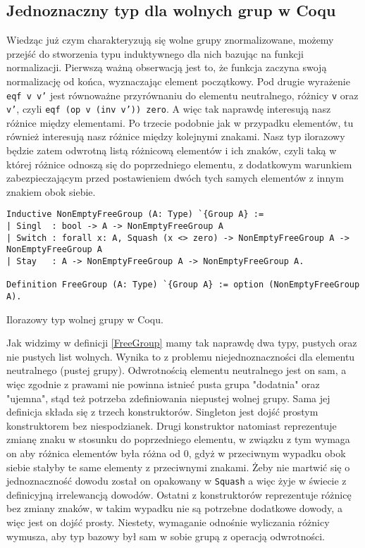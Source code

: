\subsection{Jednoznaczny typ dla wolnych grup w Coqu}
Wiedząc już czym charakteryzują się wolne grupy znormalizowane, możemy przejść do stworzenia typu induktywnego dla nich bazując na funkcji normalizacji. Pierwszą ważną obserwacją jest to, że funkcja zaczyna swoją normalizację od końca, wyznaczając element początkowy. Pod drugie wyrażenie \texttt{eqf v v'} jest równoważne przyrównaniu do elementu neutralnego, różnicy  \texttt{v} oraz \texttt{v'}, czyli \texttt{eqf (op v (inv v')) zero}. A więc tak naprawdę interesują nasz różnice między elementami. Po trzecie podobnie jak w przypadku elementów, tu również interesują nasz różnice między kolejnymi znakami. Nasz typ ilorazowy będzie zatem odwrotną listą różnicową elementów i ich znaków, czyli taką w której różnice odnoszą się do poprzedniego elementu, z dodatkowym warunkiem zabezpieczającym przed postawieniem dwóch tych samych elementów z innym znakiem obok siebie.
\begin{code}
\begin{verbatim}
Inductive NonEmptyFreeGroup (A: Type) `{Group A} :=
| Singl  : bool -> A -> NonEmptyFreeGroup A
| Switch : forall x: A, Squash (x <> zero) -> NonEmptyFreeGroup A -> NonEmptyFreeGroup A
| Stay   : A -> NonEmptyFreeGroup A -> NonEmptyFreeGroup A.

Definition FreeGroup (A: Type) `{Group A} := option (NonEmptyFreeGroup A).
\end{verbatim}
\caption{Ilorazowy typ wolnej grupy w Coqu.}
\label{FreeGroup}
\end{code}

Jak widzimy w definicji \ref{FreeGroup} mamy tak naprawdę dwa typy, pustych oraz nie pustych list wolnych. Wynika to z problemu niejednoznaczności dla elementu neutralnego (pustej grupy). Odwrotnością elementu neutralnego jest on sam, a więc zgodnie z prawami nie powinna istnieć pusta grupa "dodatnia" oraz "ujemna", stąd też potrzeba zdefiniowania niepustej wolnej grupy. Sama jej definicja składa się z trzech konstruktorów. Singleton jest dojść prostym konstruktorem bez niespodzianek. Drugi konstruktor natomiast reprezentuje zmianę znaku w stosunku do poprzedniego elementu, w związku z tym wymaga on aby różnica elementów była różna od 0, gdyż w przeciwnym wypadku obok siebie stałyby te same elementy z przeciwnymi znakami. Żeby nie martwić się o jednoznaczność dowodu został on opakowany w \texttt{Squash} a więc żyje w świecie z definicyjną irrelewancją dowodów. Ostatni z konstruktorów reprezentuje różnicę bez zmiany znaków, w takim wypadku nie są potrzebne dodatkowe dowody, a więc jest on dojść prosty. Niestety, wymaganie odnośnie wyliczania różnicy wymusza, aby typ bazowy był sam w sobie grupą z operacją odwrotności.
